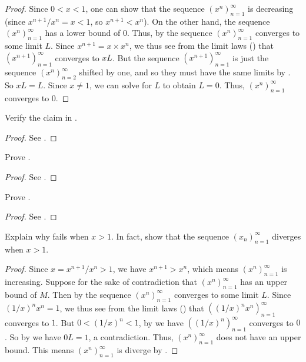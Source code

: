 \begin{proof}
  Since \(0 < x < 1\), one can show that the sequence \((x^n)_{n = 1}^\infty\) is decreasing
  (since \(x^{n + 1} / x^n = x < 1\), so \(x^{n + 1} < x^n\)).
  On the other hand, the sequence \((x^n)_{n = 1}^\infty\) has a lower bound of \(0\).
  Thus, by  the sequence \((x^n)_{n = 1}^\infty\) converges to some limit \(L\).
  Since \(x^{n + 1} = x \times x^n\), we thus see from the limit laws () that \((x^{n + 1})_{n = 1}^\infty\) converges to \(xL\).
  But the sequence \((x^{n + 1})_{n = 1}^\infty\) is just the sequence \((x^n)_{n = 2}^\infty\) shifted by one, and so they must have the same limits by .
  So \(xL = L\).
  Since \(x \neq 1\), we can solve for \(L\) to obtain \(L = 0\).
  Thus, \((x^n)_{n = 1}^\infty\) converges to \(0\).
\end{proof}

\exercisesection

\begin{ex}\label{i:ex:6.3.1}
  Verify the claim in .
\end{ex}

\begin{proof}
  See .
\end{proof}

\begin{ex}\label{i:ex:6.3.2}
  Prove .
\end{ex}

\begin{proof}
  See .
\end{proof}

\begin{ex}\label{i:ex:6.3.3}
  Prove .
\end{ex}

\begin{proof}
  See .
\end{proof}

\begin{ex}\label{i:ex:6.3.4}
  Explain why  fails when \(x > 1\).
  In fact, show that the sequence \((x_n)_{n = 1}^\infty\) diverges when \(x > 1\).
\end{ex}

\begin{proof}
  Since \(x = x^{n + 1} / x^n > 1\), we have \(x^{n + 1} > x^n\), which means \((x^n)_{n = 1}^\infty\) is increasing.
  Suppose for the sake of contradiction that \((x^n)_{n = 1}^\infty\) has an upper bound of \(M\).
  Then by  the sequence \((x^n)_{n = 1}^\infty\) converges to some limit \(L\).
  Since \((1 / x)^n x^n = 1\), we thus see from the limit laws () that \(((1 / x)^n x^n)_{n = 1}^\infty\) converges to \(1\).
  But \(0 < (1 / x)^n < 1\), by  we have \(((1 / x)^n)_{n = 1}^\infty\) converges to \(0\).
  So by  we have \(0L = 1\), a contradiction.
  Thus, \((x^n)_{n = 1}^\infty\) does not have an upper bound.
  This means \((x^n)_{n = 1}^\infty\) is diverge by .
\end{proof}

